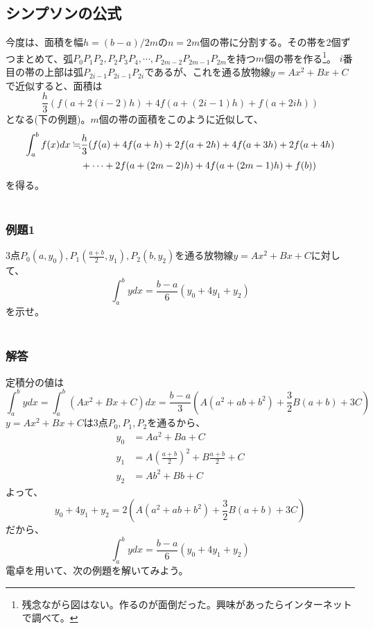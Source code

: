 \documentclass[a4j,dvipdfmx]{jsarticle}
\begin{document}
\subsection{シンプソンの公式}
今度は、面積を幅$h=(b-a)/2m$の$n=2m$個の帯に分割する。その帯を2個ずつまとめて、弧$P_0P_1P_2,P_2P_3P_4,\cdots,P_{2m-2}P_{2m-1}P_{2m}$を持つ$m$個の帯を作る\footnote{残念ながら図はない。作るのが面倒だった。興味があったらインターネットで調べて。}。
$i$番目の帯の上部は弧$P_{2i-1}P_{2i-1}P_{2i}$であるが、これを通る放物線$y=Ax^2+Bx+C$で近似すると、面積は
\begin{equation}
    \frac{h}{3}(f(a+2(i-2)h)+4f(a+(2i-1)h)+f(a+2ih))
\end{equation}
となる(下の例題)。$m$個の帯の面積をこのように近似して、
\begin{align}
    \label{simpson}
    \int_a^b f(x)dx\fallingdotseq &\frac{h}{3}(f(a)+4f(a+h)+2f(a+2h)+4f(a+3h)+2f(a+4h)\notag\\
    &+\cdots+2f(a+(2m-2)h)+4f(a+(2m-1)h)+f(b))
\end{align}
を得る。\\\\
\subsubsection*{例題1}
3点$P_0(a,y_0),P_1(\frac{a+b}{2},y_1),P_2(b,y_2)$を通る放物線$y=Ax^2+Bx+C$に対して、
\begin{equation*}
    \int_a^b ydx=\frac{b-a}{6}(y_0+4y_1+y_2)
\end{equation*}
を示せ。\\\\
\subsubsection*{解答}
定積分の値は
\begin{equation*}
    \int_a^b ydx=\int_a^b(Ax^2+Bx+C)dx=\frac{b-a}{3}(A(a^2+ab+b^2)+\frac{3}{2}B(a+b)+3C)
\end{equation*}
$y=Ax^2+Bx+C$は3点$P_0,P_1,P_2$を通るから、
\begin{align*}
    y_0&=Aa^2+Ba+C\\
    y_1&=A(\frac{a+b}{2})^2+B\frac{a+b}{2}+C\\
    y_2&=Ab^2+Bb+C
\end{align*}
よって、
\begin{equation*}
    y_0+4y_1+y_2=2(A(a^2+ab+b^2)+\frac{3}{2}B(a+b)+3C)
\end{equation*}
だから、
\begin{equation*}
    \int_a^b ydx=\frac{b-a}{6}(y_0+4y_1+y_2)
\end{equation*}
\newpage
電卓を用いて、次の例題を解いてみよう。
\end{document}
